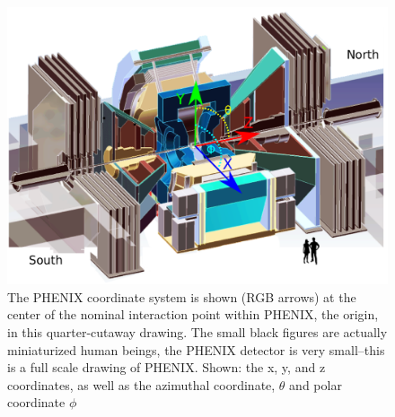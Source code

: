 \begin{figure}
  \centering
  \includegraphics[width=\linewidth]{./figures/phenix_coordinate_system.png}
  \caption{
    The PHENIX coordinate system is shown (RGB arrows) at the center of the
    nominal interaction point within PHENIX, the origin, in this quarter-cutaway
    drawing. The small black figures are actually miniaturized human beings, the
    PHENIX detector is very small--this is a full scale drawing of PHENIX.
    Shown: the x, y, and z coordinates, as well as the azimuthal coordinate,
    $\theta$ and polar coordinate $\phi$ ~\cite{WebPHENIXDrawings}
  }
  \label{fig:phenix_coordinate_system}

\end{figure}



